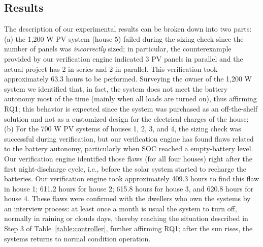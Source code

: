 \documentclass[journal]{IEEEtran}
\begin{document}
\subsection{Results}
\label{sec:results_indeed}
%
%
The description of our experimental results can be broken down into two parts: (a) the 1,200 W PV system (house 5) failed during the sizing check since the number of panels was \textit{incorrectly} sized; in particular, the counterexample provided by our verification engine indicated 3 PV panels in parallel and the actual project has 2 in series and 2 in parallel. This verification took approximately 63.3 hours to be performed. Surveying the owner of the 1,200 W system we identified that, in fact, the system does not meet the battery autonomy most of the time (mainly when all loads are turned on), thus affirming RQ1; this behavior is expected since the system was purchased as an off-the-shelf solution and not as a customized design for the electrical charges of the house; (b) For the 700 W PV systems of houses 1, 2, 3, and 4, the sizing check was successful during verification, but our verification engine has found flaws related to the battery autonomy, particularly when SOC reached a empty-battery level. Our verification engine identified those flaws (for all four houses) right after the first night-discharge cycle, i.e., before the solar system started to recharge the batteries. Our verification engine took approximately 409.3 hours to find this flaw in house 1; 611.2 hours for house 2; 615.8 hours for house 3, and 620.8 hours for house 4. These flaws were confirmed with the dwellers who own the systems by an interview process: at least once a month is usual the system to turn off, normally in raining or clouds days, thereby reaching the situation described in Step 3 of Table~\ref{table:controller}, further affirming RQ1; after the sun rises, the systems returns to normal condition operation. 
\end{document}

